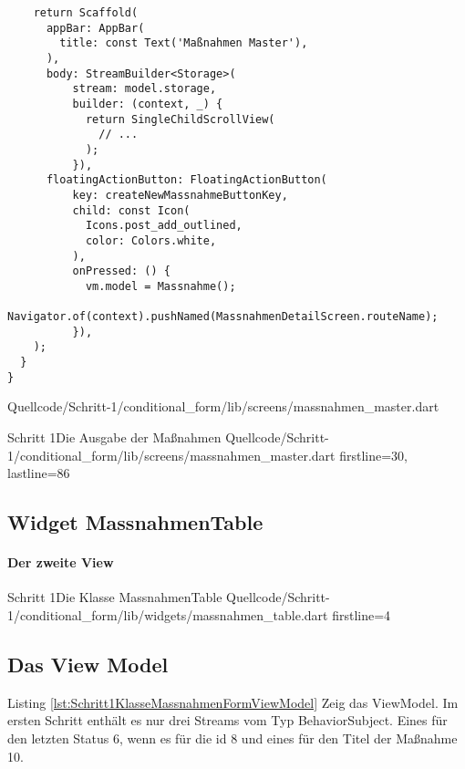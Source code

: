 {\begin{listing}[htbp]
\begin{verbatim}
    return Scaffold(
      appBar: AppBar(
        title: const Text('Maßnahmen Master'),
      ),
      body: StreamBuilder<Storage>(
          stream: model.storage,
          builder: (context, _) {
            return SingleChildScrollView(
              // ...
            );
          }),
      floatingActionButton: FloatingActionButton(
          key: createNewMassnahmeButtonKey,
          child: const Icon(
            Icons.post_add_outlined,
            color: Colors.white,
          ),
          onPressed: () {
            vm.model = Massnahme();
            Navigator.of(context).pushNamed(MassnahmenDetailScreen.routeName);
          }),
    );
  }
}
\end{verbatim}
     {Quellcode/Schritt-1/conditional_form/lib/screens/massnahmen_master.dart}
    \label{lst:Schritt1KlasseMassnahmenMasterScreenStruktur}
  \end{listing}
\fi

\begin{alexlisting}{Schritt 1}{Die Ausgabe der Maßnahmen}
  {Quellcode/Schritt-1/conditional_form/lib/screens/massnahmen_master.dart}
  {firstline=30, lastline=86}
  \label{lst:Schritt1DieAusgabeDerMassnahmen}
\end{alexlisting}

\clearpage
\subsection{Widget MassnahmenTable}
\paragraph{Der zweite View}

\begin{alexlisting}{Schritt 1}{Die Klasse MassnahmenTable}
  {Quellcode/Schritt-1/conditional_form/lib/widgets/massnahmen_table.dart}
  {firstline=4}
  \label{lst:Schritt1KlasseMassnahmenTable}
\end{alexlisting}



\subsection{ Das View Model }






Listing \ref{lst:Schritt1KlasseMassnahmenFormViewModel} Zeig das ViewModel. Im ersten Schritt enthält es nur drei Streams vom Typ BehaviorSubject. Eines für den letzten Status 6, wenn es für die id 8 und eines für den Titel der Maßnahme 10. 

}
